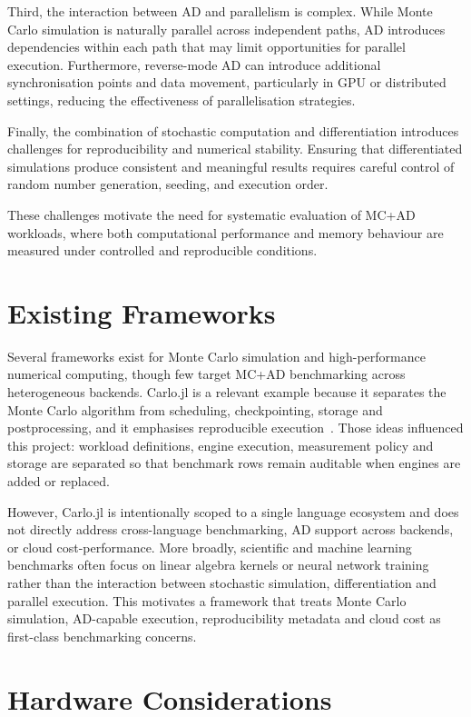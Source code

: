 Third, the interaction between AD and parallelism is complex. While Monte Carlo simulation is naturally parallel across independent paths, AD introduces dependencies within each path that may limit opportunities for parallel execution. Furthermore, reverse-mode AD can introduce additional synchronisation points and data movement, particularly in GPU or distributed settings, reducing the effectiveness of parallelisation strategies.

Finally, the combination of stochastic computation and differentiation introduces challenges for reproducibility and numerical stability. Ensuring that differentiated simulations produce consistent and meaningful results requires careful control of random number generation, seeding, and execution order.

These challenges motivate the need for systematic evaluation of MC+AD workloads, where both computational performance and memory behaviour are measured under controlled and reproducible conditions.

\section{Existing Frameworks}

Several frameworks exist for Monte Carlo simulation and high-performance
numerical computing, though few target MC+AD benchmarking across heterogeneous
backends. Carlo.jl is a relevant example because it separates the Monte Carlo
algorithm from scheduling, checkpointing, storage and postprocessing, and it
emphasises reproducible execution~\cite{weber2025carlojl}. Those ideas
influenced this project: workload definitions, engine execution, measurement
policy and storage are separated so that benchmark rows remain auditable when
engines are added or replaced.

However, Carlo.jl is intentionally scoped to a single language ecosystem and
does not directly address cross-language benchmarking, AD support across
backends, or cloud cost-performance. More broadly, scientific and machine
learning benchmarks often focus on linear algebra kernels or neural network
training rather than the interaction between stochastic simulation,
differentiation and parallel execution. This motivates a framework that treats
Monte Carlo simulation, AD-capable execution, reproducibility metadata and cloud
cost as first-class benchmarking concerns.

\section{Hardware Considerations}

